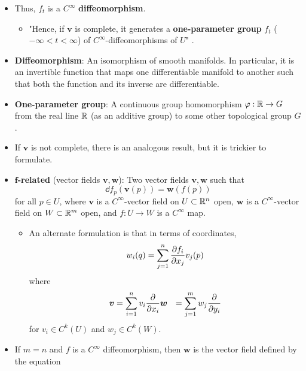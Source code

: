 \documentclass[../notes.tex]{subfiles}
\begin{document}
\begin{itemize}
\begin{enumerate}
        \begin{proof}
            See property 4.
        \end{proof}
    \end{enumerate}
    \item Thus, $f_t$ is a $C^\infty$ \textbf{diffeomorphism}.
    \begin{itemize}
        \item "Hence, if $\bm{v}$ is complete, it generates a \textbf{one-parameter group} $f_t$ ($-\infty<t<\infty$) of $C^\infty$-diffeomorphisms of $U$" \parencite[40]{bib:DifferentialForms}.
    \end{itemize}
    \item \textbf{Diffeomorphism}: An isomorphism of smooth manifolds. In particular, it is an invertible function that maps one differentiable manifold to another such that both the function and its inverse are differentiable.
    \item \textbf{One-parameter group}: A continuous group homomorphism $\varphi:\mathbb{R}\to G$ from the real line $\mathbb{R}$ (as an additive group) to some other topological group $G$.
    \item If $\bm{v}$ is not complete, there is an analogous result, but it is trickier to formulate.
    \item \textbf{$\bm{f}$-related} (vector fields $\bm{v},\bm{w}$): Two vector fields $\bm{v},\bm{w}$ such that
    \begin{equation*}
        \dd f_p(\bm{v}(p)) = \bm{w}(f(p))
    \end{equation*}
    for all $p\in U$, where $\bm{v}$ is a $C^\infty$-vector field on $U\subset\mathbb{R}^n$ open, $\bm{w}$ is a $C^\infty$-vector field on $W\subset\mathbb{R}^m$ open, and $f:U\to W$ is a $C^\infty$ map.
    \begin{itemize}
        \item An alternate formulation is that in terms of coordinates,
        \begin{equation*}
            w_i(q) = \sum_{j=1}^n\pdv{f_i}{x_j}(p)v_j(p)
        \end{equation*}
        where
        \begin{align*}
            \bm{v} &= \sum_{i=1}^nv_i\pdv{x_i}
            \bm{w} &= \sum_{j=1}^mw_j\pdv{y_i}
        \end{align*}
        for $v_i\in C^k(U)$ and $w_j\in C^k(W)$.
    \end{itemize}
    \item If $m=n$ and $f$ is a $C^\infty$ diffeomorphism, then $\bm{w}$ is the vector field defined by the equation

\end{itemize}
\end{document}
